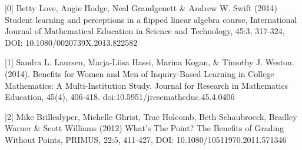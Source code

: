 \documentclass[11pt]{amsart}
\theoremstyle{plain}
\newcommand{\<}{\langle}
\renewcommand{\>}{\rangle}
\begin{document}
[0] Betty Love, Angie Hodge, Neal Grandgenett \& Andrew W. Swift (2014) Student learning and perceptions in a flipped linear algebra course, International Journal of Mathematical Education in Science and Technology, 45:3, 317-324, DOI: 10.1080/0020739X.2013.822582 

[1] Sandra L. Laursen, Marja-Liisa Hassi, Marina Kogan, \& Timothy J. Weston. (2014). Benefits for Women and Men of Inquiry-Based Learning in College Mathematics: A Multi-Institution Study. Journal for Research in Mathematics Education, 45(4), 406-418. doi:10.5951/jresematheduc.45.4.0406

[2] Mike Brilleslyper, Michelle Ghrist, Trae Holcomb, Beth Schaubroeck, Bradley Warner \& Scott Williams (2012) What's The Point? The Benefits of Grading Without Points, PRIMUS, 22:5, 411-427, DOI: 10.1080/10511970.2011.571346
\end{document}

